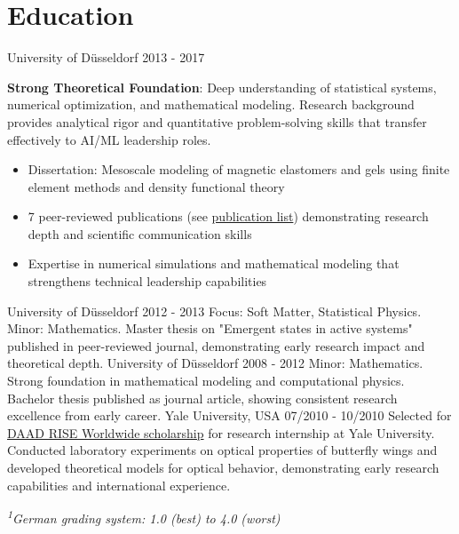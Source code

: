 \documentclass[singlesided,
               paper=a4,
               fontsize=10pt
              ]{my-resume}
\begin{document}
\section[\faMortarBoard]{Education}
    {University of Düsseldorf}
    {2013 - 2017}
    {
        \textbf{Strong Theoretical Foundation}: Deep understanding of statistical systems, numerical optimization, and mathematical modeling. Research background provides analytical rigor and quantitative problem-solving skills that transfer effectively to AI/ML leadership roles.
        \begin{itemize}[leftmargin=2em]
            \item Dissertation: Mesoscale modeling of magnetic elastomers and gels using finite element methods and density functional theory
            \item 7 peer-reviewed publications (see \href{https://scholar.google.com/citations?hl=de&user=MnU8ZxwAAAAJ}{publication list}) demonstrating research depth and scientific communication skills
            \item Expertise in numerical simulations and mathematical modeling that strengthens technical leadership capabilities
        \end{itemize}
    }
%
    {University of Düsseldorf}
    {2012 - 2013}
    {
        Focus: Soft Matter, Statistical Physics. Minor: Mathematics. Master thesis on "Emergent states in active systems" published in peer-reviewed journal, demonstrating early research impact and theoretical depth.
    }
%
    {University of Düsseldorf}
    {2008 - 2012}
    {
        Minor: Mathematics. Strong foundation in mathematical modeling and computational physics. Bachelor thesis published as journal article, showing consistent research excellence from early career.
    }
%
    {Yale University, USA}
    {07/2010 - 10/2010}
    {
        Selected for \href{https://www.daad.de/rise/en/rise-worldwide/about-the-programm/}{DAAD RISE Worldwide scholarship} for research internship at Yale University. Conducted laboratory experiments on optical properties of butterfly wings and developed theoretical models for optical behavior, demonstrating early research capabilities and international experience.
    }

\vspace{0.5em}
\textit{\small \textsuperscript{1}German grading system: 1.0 (best) to 4.0 (worst)}
\end{document}
